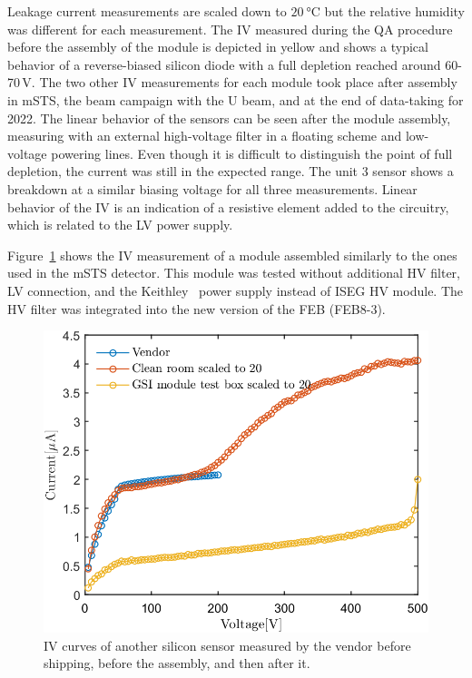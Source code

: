 Leakage current measurements are scaled down to $\SI{20}{\celsius}$ but the relative humidity was different for each measurement. The IV measured during the QA procedure before the assembly of the module is depicted in yellow and shows a typical behavior of a reverse-biased silicon diode with a full depletion reached around 60-70\,V. The two other IV measurements for each module took place after assembly in \gls{mSTS}, the beam campaign with the U beam, and at the end of data-taking for 2022. The linear behavior of the sensors can be seen after the module assembly, measuring with an external high-voltage filter in a floating scheme and low-voltage powering lines. Even though it is difficult to distinguish the point of full depletion, the current was still in the expected range. The unit 3 sensor shows a breakdown at a similar biasing voltage for all three measurements. Linear behavior of the IV is an indication of a resistive element added to the circuitry, which is related to the \gls{LV} power supply. 

Figure~\ref{fig_IV_good} shows the IV measurement of a module assembled similarly to the ones used in the \gls{mSTS} detector.
This module was tested without additional \gls{HV} filter, \gls{LV} connection, and the Keithley~\cite{Keithley} power supply instead of ISEG \gls{HV} module. The \gls{HV} filter was integrated into the new version of the \gls{FEB} (FEB8-3). 

\begin{figure}[!h]
\centering
\includegraphics[width=0.5\columnwidth]{Chapter6/DCS/images/IV/30304Whole.png}
\caption{IV curves of another silicon sensor measured by the vendor before shipping, before the assembly, and then after it.} 
\label{fig_IV_good}
\end{figure}

\newpage
